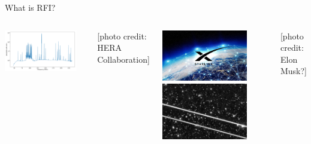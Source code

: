 \documentclass{beamer}
\begin{document}
\begin{frame}{What is RFI?}
\begin{columns}
\includegraphics[width=0.9\textwidth]{rfi_example.png}

\tiny [photo credit: HERA Collaboration]

\includegraphics[width=0.8\textwidth]{starlink.jpg}
\includegraphics[width=0.8\textwidth]{starlink2.png}

\tiny [photo credit: Elon Musk?]
\end{columns}
\end{frame}
\end{document}
